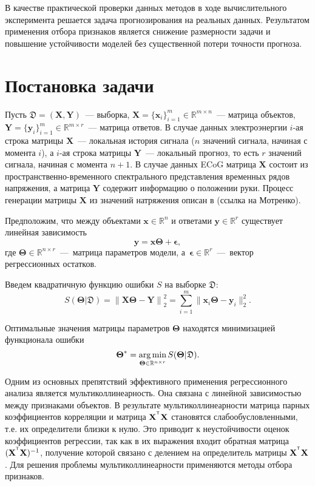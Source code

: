 \documentclass[12pt,twoside]{article}
\newcommand{\bx}{\mathbf{x}}
\newcommand{\by}{\mathbf{y}}
\newcommand{\bY}{\mathbf{Y}}
\newcommand{\bX}{\mathbf{X}}
\newcommand{\bTheta}{\boldsymbol{\Theta}}
\begin{document}
В качестве практической проверки данных методов в ходе вычислительного эксперимента решается задача прогнозирования на реальных данных.
Результатом применения отбора признаков является снижение размерности задачи и повышение устойчивости моделей без существенной потери точности прогноза.
 

\section{Постановка задачи}

Пусть $\mathfrak{D}= \left( \bX, \bY \right)$~--- выборка, $\mathbf{X} = \{\bx_i\}_{i=1}^m\in \mathbb{R}^{m \times n}$~--- матрица объектов, $\mathbf{Y} = \{\by_i\}_{i=1}^m \in \mathbb{R}^{m \times r}$~--- матрица ответов. 
В случае данных электроэнергии $i$-ая строка  матрицы $\bX$~--– локальная история сигнала ($n$ значений сигнала, начиная с момента $i$), а $i$-ая строка матрицы $\bY$~--– локальный прогноз, то есть $r$ значений сигнала, начиная с момента $n+1$. В случае данных ECoG матрица $\bX$ состоит из пространственно-временного спектрального представления временных рядов напряжения, а матрица $\bY$ содержит информацию о положении руки. Процесс генерации матрицы $\bX$ из значений натряжения описан в (ссылка на Мотренко). 

Предположим, что между объектами $\bx \in \mathbb{R}^n$ и ответами $\by \in \mathbb{R}^r$ существует линейная зависимость 
$$\by = \bx \bTheta + \boldsymbol{\epsilon}, $$ 
где $\bTheta \in \mathbb{R}^{n \times r}$~---~матрица параметров модели, а~$\boldsymbol{\epsilon}\in \mathbb{R}^{r}$~---~вектор регрессионных остатков.

Введем квадратичную функцию ошибки $S$ на выборке $\mathfrak{D}$:
\[
	S(\bTheta | \mathfrak{D}) = {\bigl\| \mathbf{X}\bTheta - \mathbf{Y} \bigr\| }_2^2 = \sum_{i=1}^m \| \bx_i \bTheta - \by_i\|_2^2.
\]

Оптимальные значения матрицы параметров $\bTheta$ находятся минимизацией функционала ошибки 
\[
{\bTheta}^{*} = \argmin_{\bTheta \in \mathbb{R}^{n \times r}} S(\bTheta | \mathfrak{D}).
\]
 

Одним из основных препятствий эффективного применения регрессионного анализа является мультиколлинеарность. Она связана с линейной зависимостью между признаками объектов. В результате мультиколлинеарности матрица парных коэффициентов корреляции и матрица $\bX^{\T} \bX$ становятся слабообусловленными, т.е. их определители близки к нулю. Это приводит к неустойчивости оценок коэффициентов регрессии, так как в их выражения входит обратная матрица $(\bX^{\T}\bX)^{-1}$, получение которой связано с делением на определитель матрицы $\bX^{\T}\bX$. 
Для решения проблемы мультиколлинеарности применяются методы отбора признаков. 
\end{document}
